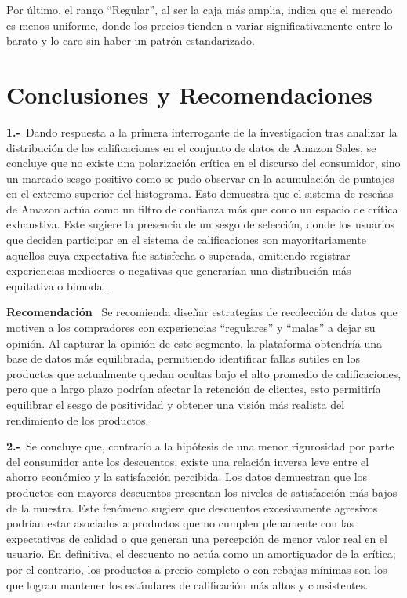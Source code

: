 \documentclass[oneside,11pt]{Latex/Classes/PhDthesisPSnPDF}
\begin{document}
Por último, el rango ``Regular'', al ser la caja más amplia, indica que
el mercado es menos uniforme, donde los precios tienden a variar
significativamente entre lo barato y lo caro sin haber un patrón
estandarizado.

\chapter{Conclusiones y Recomendaciones}

\textbf{1.-}~Dando respuesta a la primera interrogante de la
investigacion tras analizar la distribución de las calificaciones en el
conjunto de datos de Amazon Sales, se concluye que no existe una
polarización crítica en el discurso del consumidor, sino un marcado
sesgo positivo como se pudo observar en la acumulación de puntajes en el
extremo superior del histograma. Esto demuestra que el sistema de
reseñas de Amazon actúa como un filtro de confianza más que como un
espacio de crítica exhaustiva. Este sugiere la presencia de un sesgo de
selección, donde los usuarios que deciden participar en el sistema de
calificaciones son mayoritariamente aquellos cuya expectativa fue
satisfecha o superada, omitiendo registrar experiencias mediocres o
negativas que generarían una distribución más equitativa o bimodal.

\textbf{Recomendación} ~Se recomienda diseñar estrategias de recolección
de datos que motiven a los compradores con experiencias ``regulares'' y
``malas'' a dejar su opinión. Al capturar la opinión de este segmento,
la plataforma obtendría una base de datos más equilibrada, permitiendo
identificar fallas sutiles en los productos que actualmente quedan
ocultas bajo el alto promedio de calificaciones, pero que a largo plazo
podrían afectar la retención de clientes, esto permitiría equilibrar el
sesgo de positividad y obtener una visión más realista del rendimiento
de los productos.

\textbf{2.-}~Se concluye que, contrario a la hipótesis de una menor
rigurosidad por parte del consumidor ante los descuentos, existe una
relación inversa leve entre el ahorro económico y la satisfacción
percibida. Los datos demuestran que los productos con mayores descuentos
presentan los niveles de satisfacción más bajos de la muestra. Este
fenómeno sugiere que descuentos excesivamente agresivos podrían estar
asociados a productos que no cumplen plenamente con las expectativas de
calidad o que generan una percepción de menor valor real en el usuario.
En definitiva, el descuento no actúa como un amortiguador de la crítica;
por el contrario, los productos a precio completo o con rebajas mínimas
son los que logran mantener los estándares de calificación más altos y
consistentes.
\end{document}
